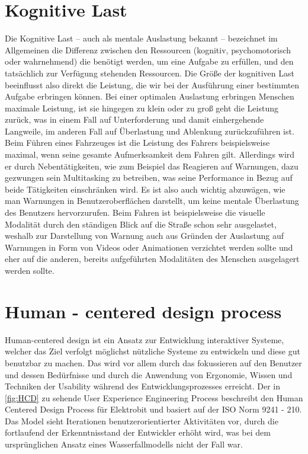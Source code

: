 \section{Kognitive Last}
Die Kognitive Last – auch als mentale Auslastung bekannt – bezeichnet im Allgemeinen die Differenz zwischen den Ressourcen (kognitiv, psychomotorisch oder wahrnehmend) die benötigt werden, um eine Aufgabe zu erfüllen, und den tatsächlich zur Verfügung stehenden Ressourcen. Die Größe der kognitiven Last beeinflusst also direkt die Leistung, die wir bei der Ausführung einer bestimmten Aufgabe erbringen können. Bei einer optimalen Auslastung erbringen Menschen maximale Leistung, ist sie hingegen zu klein oder zu groß geht die Leistung zurück, was in einem Fall auf Unterforderung und damit einhergehende Langweile, im anderen Fall auf Überlastung und Ablenkung zurückzuführen ist\cite{.e}. Beim Führen eines Fahrzeuges ist die Leistung des Fahrers beispielsweise maximal, wenn seine gesamte Aufmerksamkeit dem Fahren gilt. Allerdings wird er durch Nebentätigkeiten, wie zum Beispiel das Reagieren auf Warnungen, dazu gezwungen sein Multitasking zu betreiben, was seine Performance in Bezug auf beide Tätigkeiten einschränken wird. Es ist also auch wichtig abzuwägen, wie man Warnungen in Benutzeroberflächen darstellt, um keine mentale Überlastung des Benutzers hervorzurufen. Beim Fahren ist beispielsweise die visuelle Modalität durch den ständigen Blick auf die Straße schon sehr ausgelastet, weshalb zur Darstellung von Warnung auch aus Gründen der Auslastung auf Warnungen in Form von Videos oder Animationen verzichtet werden sollte und eher auf die anderen, bereits aufgeführten Modalitäten des Menschen ausgelagert werden sollte.

\section{Human - centered  design process}
Human-centered design ist ein Ansatz zur Entwicklung interaktiver Systeme, welcher das Ziel verfolgt möglichst nützliche Systeme zu entwickeln und diese gut benutzbar zu machen.
Das wird vor allem durch das fokussieren auf den Benutzer und dessen Bedürfnisse und durch die Anwendung von Ergonomie, Wissen und Techniken der Usability während des Entwicklungsprozesses erreicht\cite{.}.
Der in \cref{fig:HCD} zu sehende User Experience Engineering Process beschreibt den Human Centered Design Process für Elektrobit und basiert auf der ISO Norm 9241 - 210.
Das Model sieht Iterationen benutzerorientierter Aktivitäten vor, durch die fortlaufend der Erkenntnisstand der Entwickler erhöht wird, was bei dem ursprünglichen Ansatz eines Wasserfallmodells nicht der Fall war.

